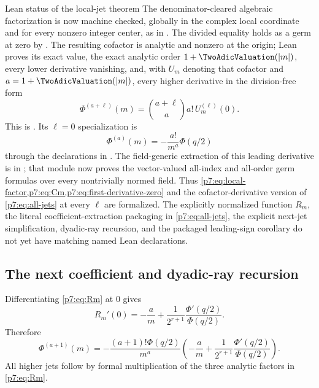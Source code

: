 \documentclass[11pt]{article}
\numberwithin{equation}{section}
\theoremstyle{definition}
\theoremstyle{remark}
\begin{document}
\begin{statusboxPartxx}{Lean status of the local-jet theorem}
The denominator-cleared algebraic factorization is now machine checked,
globally in the complex local coordinate and for every nonzero integer
center, as
 in
.  The divided equality holds as a
germ at zero by
.
The resulting cofactor is analytic and nonzero at the origin; Lean proves
its exact value, the exact analytic order \(1+\TwoAdicValuation(|m|)\), every lower
derivative vanishing, and, with \(U_m\) denoting that cofactor and
\(a=1+\TwoAdicValuation(|m|)\), every higher derivative in the division-free form
\[
 \Phi^{(a+\ell)}(m)=\binom{a+\ell}{a}a!\,U_m^{(\ell)}(0).
\]
This is
.  Its
\(\ell=0\) specialization is
\[
 \Phi^{(a)}(m)=-\frac{a!}{m^a}\Phi(q/2)
\]
through the declarations in .  The
field-generic extraction of this leading derivative is in
; that module now proves the vector-valued all-index and
all-order germ formulas over every nontrivially normed field.  Thus
\cref{p7:eq:local-factor,p7:eq:Cm,p7:eq:first-derivative-zero} and the
cofactor-derivative version of \cref{p7:eq:all-jets} at every \(\ell\) are
formalized.  The explicitly normalized function \(R_m\), the literal
coefficient-extraction packaging in \cref{p7:eq:all-jets}, the explicit
next-jet simplification, dyadic-ray recursion, and the packaged leading-sign
corollary do not yet have matching named Lean declarations.
\end{statusboxPartxx}

\subsection{The next coefficient and dyadic-ray recursion}

Differentiating \cref{p7:eq:Rm} at $0$ gives
\begin{equation}\label{p7:eq:Rprime}
 R_m'(0)=-\frac{a}{m}
 +\frac1{2^{r+1}}\frac{\Phi'(q/2)}{\Phi(q/2)}.
\end{equation}
Therefore
\begin{equation}\label{p7:eq:next-jet}
 \Phi^{(a+1)}(m)
 =-\frac{(a+1)!\Phi(q/2)}{m^a}
 \left(-\frac{a}{m}
 +\frac1{2^{r+1}}\frac{\Phi'(q/2)}{\Phi(q/2)}\right).
\end{equation}
All higher jets follow by formal multiplication of the three analytic factors in \cref{p7:eq:Rm}.
\end{document}
